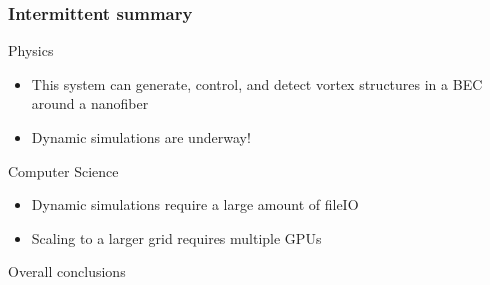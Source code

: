 \documentclass{beamer}
\begin{document}
\begin{frame}
\frametitle{Intermittent summary}
Physics
\begin{itemize}
\item This system can generate, control, and detect vortex structures in a BEC around a nanofiber
\item Dynamic simulations are underway!
\end{itemize}

\pause
\vspace{0.5cm}

Computer Science
\begin{itemize}
\item Dynamic simulations require a large amount of fileIO
\item Scaling to a larger grid requires multiple GPUs
\end{itemize}
\end{frame}


\begin{frame}
\center \huge Overall conclusions
\end{frame}
\end{document}
